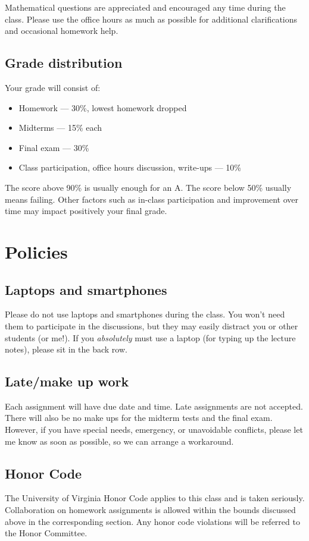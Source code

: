\documentclass[oneside,11pt]{amsart}
\begin{document}
Mathematical questions are appreciated and encouraged any time during the
class. Please use the office hours as much as possible for additional
clarifications and occasional homework help.

\subsection{Grade distribution}

Your grade will consist of:
\begin{itemize}
	\item Homework --- 30\%, lowest homework dropped
	\item Midterms --- 15\% each
	\item Final exam --- 30\%
	\item Class participation, office hours discussion, write-ups --- 10\%
\end{itemize}
The score above 90\% is usually enough for an A.
The score below 50\% usually means failing.
Other factors such as in-class participation
and improvement over time may impact positively your final grade.

\section{Policies}

\subsection{Laptops and smartphones}

Please do not use laptops and smartphones during the class.
You won't need them to participate in the discussions, but they may easily distract
you or other students (or me!). If you \emph{absolutely} must use a laptop
(for typing up the lecture notes), please sit in the back row.

\subsection{Late/make up work} Each assignment will have due date and time.
Late assignments are not accepted. There will also be no make ups for the midterm tests and the final exam.
However, if you have special needs, emergency, or unavoidable conflicts, please
let me know as soon as possible, so we can arrange a workaround.

\subsection{Honor Code} The University of Virginia Honor Code applies to this
class and is taken seriously. Collaboration on homework
assignments is allowed within the bounds discussed above
in the corresponding section.
Any honor code violations will be referred to the
Honor Committee.
\end{document}
